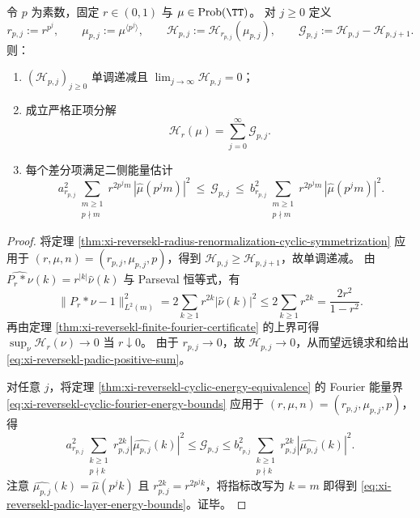 \begin{theorem}\label{thm:xi-reversekl-padic-entropy-cascade}
令 \(p\) 为素数，固定 \(r\in(0,1)\) 与 \(\mu\in\mathrm{Prob}(\TT)\)。
对 \(j\ge 0\) 定义
\[
r_{p,j}:=r^{p^j},\qquad \mu_{p,j}:=\mu^{\langle p^j\rangle},\qquad
\mathcal H_{p,j}:=\mathcal H_{r_{p,j}}(\mu_{p,j}),
\qquad
\mathcal G_{p,j}:=\mathcal H_{p,j}-\mathcal H_{p,j+1}.
\]
则：
\begin{enumerate}
  \item \((\mathcal H_{p,j})_{j\ge 0}\) 单调递减且 \(\lim_{j\to\infty}\mathcal H_{p,j}=0\)；
  \item 成立严格正项分解
  \begin{equation}\label{eq:xi-reversekl-padic-positive-sum}
  \boxed{\ \mathcal H_r(\mu)=\sum_{j=0}^{\infty}\mathcal G_{p,j}.\ }
  \end{equation}
  \item 每个差分项满足二侧能量估计
  \begin{equation}\label{eq:xi-reversekl-padic-layer-energy-bounds}
  \boxed{\
  a_{r_{p,j}}^2\!\sum_{\substack{m\ge 1\\ p\nmid m}} r^{2p^j m}\,|\widehat\mu(p^j m)|^2
  \ \le\
  \mathcal G_{p,j}
  \ \le\
  b_{r_{p,j}}^2\!\sum_{\substack{m\ge 1\\ p\nmid m}} r^{2p^j m}\,|\widehat\mu(p^j m)|^2.
  }
  \end{equation}
\end{enumerate}
\end{theorem}
\begin{proof}
将定理 \ref{thm:xi-reversekl-radius-renormalization-cyclic-symmetrization} 应用于 \((r,\mu,n)=(r_{p,j},\mu_{p,j},p)\)，得到
\(
\mathcal H_{p,j}\ge \mathcal H_{p,j+1}
\)，故单调递减。
由 \(\widehat{P_{r}*\nu}(k)=r^{|k|}\widehat\nu(k)\) 与 Parseval 恒等式，有
\[
\|P_{r}*\nu-1\|_{L^2(m)}^2
=2\sum_{k\ge 1}r^{2k}|\widehat\nu(k)|^2
\le 2\sum_{k\ge 1}r^{2k}=\frac{2r^2}{1-r^2}.
\]
再由定理 \ref{thm:xi-reversekl-finite-fourier-certificate} 的上界可得 \(\sup_{\nu}\mathcal H_r(\nu)\to 0\) 当 \(r\downarrow 0\)。
由于 \(r_{p,j}\to 0\)，故 \(\mathcal H_{p,j}\to 0\)，从而望远镜求和给出 \eqref{eq:xi-reversekl-padic-positive-sum}。

对任意 \(j\)，将定理 \ref{thm:xi-reversekl-cyclic-energy-equivalence} 的 Fourier 能量界 \eqref{eq:xi-reversekl-cyclic-fourier-energy-bounds} 应用于 \((r,\mu,n)=(r_{p,j},\mu_{p,j},p)\)，得
\[
a_{r_{p,j}}^2\!\sum_{\substack{k\ge 1\\ p\nmid k}} r_{p,j}^{2k}|\widehat{\mu_{p,j}}(k)|^2
\le \mathcal G_{p,j}\le
b_{r_{p,j}}^2\!\sum_{\substack{k\ge 1\\ p\nmid k}} r_{p,j}^{2k}|\widehat{\mu_{p,j}}(k)|^2.
\]
注意 \(\widehat{\mu_{p,j}}(k)=\widehat\mu(p^j k)\) 且 \(r_{p,j}^{2k}=r^{2p^j k}\)，将指标改写为 \(k=m\) 即得到 \eqref{eq:xi-reversekl-padic-layer-energy-bounds}。证毕。
\end{proof}

\endinput

